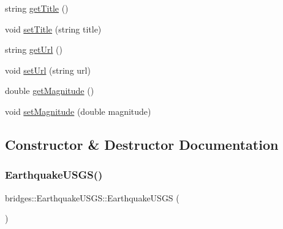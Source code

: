 \begin{DoxyCompactItemize}
\item 
string \hyperlink{classbridges_1_1_earthquake_u_s_g_s_a6b8e10f1a092c8884428cecbd1defb19}{get\+Title} ()
\item 
void \hyperlink{classbridges_1_1_earthquake_u_s_g_s_a78fe86dcb1bae8470d5ac58fdda2fe51}{set\+Title} (string title)
\item 
string \hyperlink{classbridges_1_1_earthquake_u_s_g_s_a60961cae033becb6144c883a7a984f86}{get\+Url} ()
\item 
void \hyperlink{classbridges_1_1_earthquake_u_s_g_s_ac07298c50e03955d167a2ca38c5150be}{set\+Url} (string url)
\item 
double \hyperlink{classbridges_1_1_earthquake_u_s_g_s_a51659fac2236aaaa03d2921fd7c1fcf9}{get\+Magnitude} ()
\item 
void \hyperlink{classbridges_1_1_earthquake_u_s_g_s_aae8be6112f5c27c168c452261d9b29a2}{set\+Magnitude} (double magnitude)
\end{DoxyCompactItemize}


\subsection{Constructor \& Destructor Documentation}
\hypertarget{classbridges_1_1_earthquake_u_s_g_s_a540ae74c248da179fbbd182b843a14e0}{}\label{classbridges_1_1_earthquake_u_s_g_s_a540ae74c248da179fbbd182b843a14e0} 
\subsubsection{\texorpdfstring{Earthquake\+U\+S\+G\+S()}{EarthquakeUSGS()}\hspace{0.1cm}{\footnotesize\ttfamily [1/3]}}
{\footnotesize\ttfamily bridges\+::\+Earthquake\+U\+S\+G\+S\+::\+Earthquake\+U\+S\+GS (\begin{DoxyParamCaption}{ }\end{DoxyParamCaption})\hspace{0.3cm}{\ttfamily [inline]}}

\hypertarget{classbridges_1_1_earthquake_u_s_g_s_a9c7f7aec2ddc173660a7015b90c7b7b0}{}\label{classbridges_1_1_earthquake_u_s_g_s_a9c7f7aec2ddc173660a7015b90c7b7b0} 
